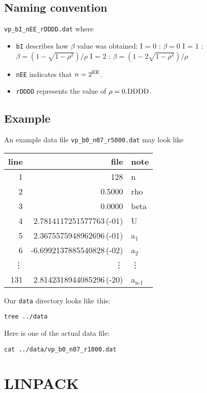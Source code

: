 \documentclass[11pt]{article}
\begin{document}
\subsection{Naming convention}
\label{sec:orgec1d30d}
\texttt{vp\_bI\_nEE\_rDDDD.dat} where
\begin{itemize}
\item \texttt{bI} describes how \(\beta\) value was obtained:
I = 0 : \(\beta = 0\)
I = 1 : \(\beta = (1 - \sqrt{1-\rho^2})/\rho\)
I = 2 : \(\beta = (1 - 2\sqrt{1-\rho^2})/\rho\)
\item \texttt{nEE} indicates that \(n = 2^{\rm EE}\).
\item \texttt{rDDDD} represents the value of \(\rho = 0.{\rm DDDD}\).
\end{itemize}
\subsection{Example}
\label{sec:org83e5060}
An example data file \texttt{vp\_b0\_n07\_r5000.dat} may look like
\begin{center}
\begin{tabular}{rrl}
line & file & note\\
\hline
1 & 128 & n\\
2 & 0.5000 & rho\\
3 & 0.0000 & beta\\
4 & 2.7814117251577763\,(-01) & U\\
5 & 2.3675575948962696\,(-01) & a\(_{\text{1}}\)\\
6 & -6.6992137885540828\,(-02) & a\(_{\text{2}}\)\\
\vdots & \vdots & \vdots\\
131 & 2.8142318944085296\,(-20) & a\(_{\text{n-1}}\)\\
\end{tabular}
\end{center}

Our \texttt{data} directory looks like this:
\begin{verbatim}
tree ../data
\end{verbatim}

Here is one of the actual data file:
\begin{verbatim}
cat ../data/vp_b0_n07_r1000.dat
\end{verbatim}

\section{LINPACK}
\label{sec:org04b268f}
\end{document}
